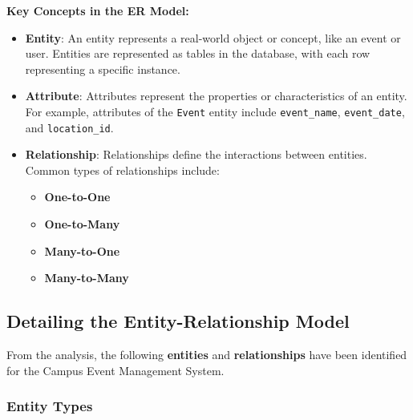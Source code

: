 \textbf{Key Concepts in the ER Model:}

\begin{itemize}
    \item \textbf{Entity}: An entity represents a real-world object or concept, like an event or user. Entities are represented as tables in the database, with each row representing a specific instance.
    \item \textbf{Attribute}: Attributes represent the properties or characteristics of an entity. For example, attributes of the \texttt{Event} entity include \texttt{event\_name}, \texttt{event\_date}, and \texttt{location\_id}.
    \item \textbf{Relationship}: Relationships define the interactions between entities. Common types of relationships include:
    \begin{itemize}
        \item \textbf{One-to-One}
        \item \textbf{One-to-Many}
        \item \textbf{Many-to-One}
        \item \textbf{Many-to-Many}
    \end{itemize}
\end{itemize}

\subsection{Detailing the Entity-Relationship Model}

From the analysis, the following \textbf{entities} and \textbf{relationships} have been identified for the Campus Event Management System.

\subsubsection{Entity Types}

